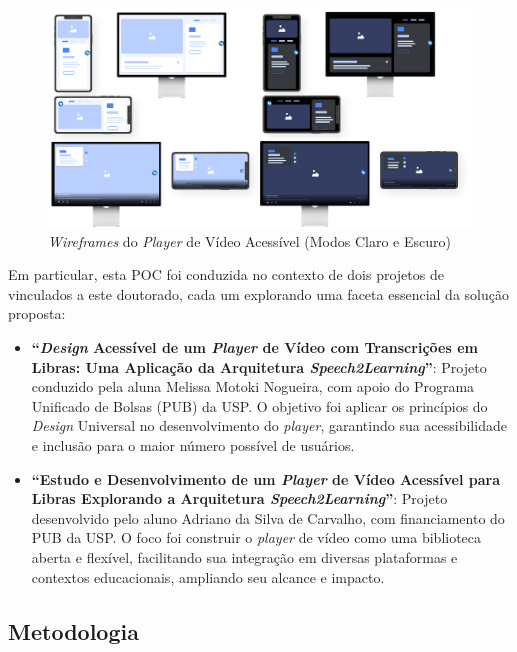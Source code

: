 \begin{figure}[htbp]
\centering
\caption{\textit{Wireframes} do \textit{Player} de Vídeo Acessível (Modos Claro e Escuro)}
\label{fig:chapter4-cs2-poc-wireframes}
\includegraphics[width=.95\textwidth]{images/chapter4-cs2-poc-wireframes.png}
\fautor
\end{figure}

Em particular, esta POC foi conduzida no contexto de dois projetos de  vinculados a este doutorado, cada um explorando uma faceta essencial da solução proposta:

\begin{itemize}
\item \textbf{``\textit{Design} Acessível de um \textit{Player} de Vídeo com Transcrições em Libras: Uma Aplicação da Arquitetura \textit{Speech2Learning}''}: Projeto conduzido pela aluna Melissa Motoki Nogueira, com apoio do Programa Unificado de Bolsas (PUB) da USP. O objetivo foi aplicar os princípios do \textit{Design} Universal no desenvolvimento do \textit{player}, garantindo sua acessibilidade e inclusão para o maior número possível de usuários.

\item \textbf{``Estudo e Desenvolvimento de um \textit{Player} de Vídeo Acessível para Libras Explorando a Arquitetura \textit{Speech2Learning}''}: Projeto desenvolvido pelo aluno Adriano da Silva de Carvalho, com financiamento do PUB da USP. O foco foi construir o \textit{player} de vídeo como uma biblioteca aberta e flexível, facilitando sua integração em diversas plataformas e contextos educacionais, ampliando seu alcance e impacto.
\end{itemize}

\subsection{Metodologia}

